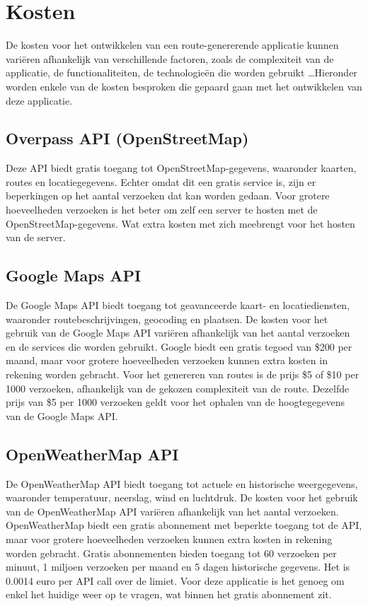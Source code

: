     \section{Kosten}

    De kosten voor het ontwikkelen van een route-genererende applicatie kunnen variëren afhankelijk van verschillende factoren, zoals de complexiteit van de applicatie, de functionaliteiten,
    de technologieën die worden gebruikt \ldots Hieronder worden enkele van de kosten besproken die gepaard gaan met het ontwikkelen van deze applicatie.

    \subsection{Overpass API (OpenStreetMap)}

    Deze API biedt gratis toegang tot OpenStreetMap-gegevens, waaronder kaarten, routes en locatiegegevens. Echter omdat dit een gratis service is,
    zijn er beperkingen op het aantal verzoeken dat kan worden gedaan. Voor grotere hoeveelheden verzoeken is het beter om zelf een server te hosten met de OpenStreetMap-gegevens.
    Wat extra kosten met zich meebrengt voor het hosten van de server.

    \subsection{Google Maps API}

    De Google Maps API biedt toegang tot geavanceerde kaart- en locatiediensten, waaronder routebeschrijvingen, geocoding en plaatsen.
    De kosten voor het gebruik van de Google Maps API variëren afhankelijk van het aantal verzoeken en de services die worden gebruikt.
    Google biedt een gratis tegoed van \$200 per maand, maar voor grotere hoeveelheden verzoeken kunnen extra kosten in rekening worden gebracht.
    Voor het genereren van routes is de prijs \$5 of \$10 per 1000 verzoeken, afhankelijk van de gekozen complexiteit van de route.
    Dezelfde prijs van \$5 per 1000 verzoeken geldt voor het ophalen van de hoogtegegevens van de Google Maps API.

    \subsection{OpenWeatherMap API}

    De OpenWeatherMap API biedt toegang tot actuele en historische weergegevens, waaronder temperatuur, neerslag, wind en luchtdruk.
    De kosten voor het gebruik van de OpenWeatherMap API variëren afhankelijk van het aantal verzoeken.
    OpenWeatherMap biedt een gratis abonnement met beperkte toegang tot de API, maar voor grotere hoeveelheden verzoeken kunnen extra kosten in rekening worden gebracht.
    Gratis abonnementen bieden toegang tot 60 verzoeken per minuut, 1 miljoen verzoeken per maand en 5 dagen historische gegevens.
    Het is 0.0014 euro per API call over de limiet. Voor deze applicatie is het genoeg om enkel het huidige weer op te vragen, wat binnen het gratis abonnement zit.



